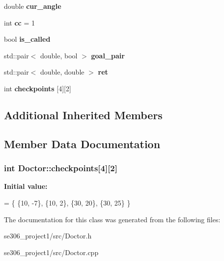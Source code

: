 \begin{DoxyCompactItemize}
\item 
\hypertarget{classDoctor_ab67e7a3eab1a57a0cfa52d84fe52414d}{double {\bfseries cur\-\_\-angle}}\label{classDoctor_ab67e7a3eab1a57a0cfa52d84fe52414d}

\item 
\hypertarget{classDoctor_a254303eb3ae4982340eb079ea76e942a}{int {\bfseries cc} = 1}\label{classDoctor_a254303eb3ae4982340eb079ea76e942a}

\item 
\hypertarget{classDoctor_a0566f795b41ece871b82ed7b63c5a780}{bool {\bfseries is\-\_\-called}}\label{classDoctor_a0566f795b41ece871b82ed7b63c5a780}

\item 
\hypertarget{classDoctor_a31d510c612a7f9d59efbcc8327f7adf3}{std\-::pair$<$ double, bool $>$ {\bfseries goal\-\_\-pair}}\label{classDoctor_a31d510c612a7f9d59efbcc8327f7adf3}

\item 
\hypertarget{classDoctor_ac371e75b4dcac584c9f2fa89585fefd7}{std\-::pair$<$ double, double $>$ {\bfseries ret}}\label{classDoctor_ac371e75b4dcac584c9f2fa89585fefd7}

\item 
int {\bfseries checkpoints} \mbox{[}4\mbox{]}\mbox{[}2\mbox{]}
\end{DoxyCompactItemize}
\subsection*{Additional Inherited Members}


\subsection{Member Data Documentation}
\hypertarget{classDoctor_a9bb025d7f8f843371b1c63414272afe1}{
\subsubsection[{checkpoints}]{\setlength{\rightskip}{0pt plus 5cm}int Doctor\-::checkpoints\mbox{[}4\mbox{]}\mbox{[}2\mbox{]}\hspace{0.3cm}{\ttfamily [protected]}}}\label{classDoctor_a9bb025d7f8f843371b1c63414272afe1}
{\bfseries Initial value\-:}
\begin{DoxyCode}
= \{
                \{10, -7\},
                \{10, 2\},
                \{30, 20\},
                \{30, 25\}
                \}
\end{DoxyCode}


The documentation for this class was generated from the following files\-:\begin{DoxyCompactItemize}
\item 
se306\-\_\-project1/src/Doctor.\-h\item 
se306\-\_\-project1/src/Doctor.\-cpp\end{DoxyCompactItemize}
